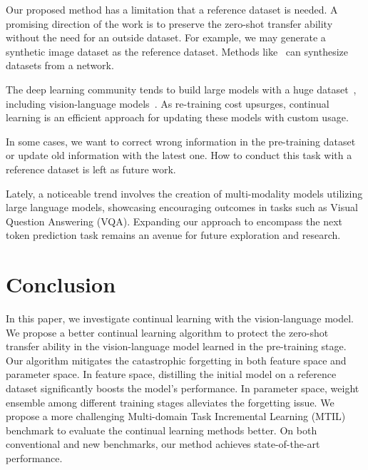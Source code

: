 Our proposed method has a limitation that a reference dataset is needed. A promising direction of the work is to preserve the zero-shot transfer ability without the need for an outside dataset. For example, we may generate a synthetic image dataset as the reference dataset. Methods like~\cite{smith2021always} can synthesize datasets from a network.

The deep learning community tends to build large models with a huge dataset~\cite{brown2020language,dehghani2023scaling}, including vision-language models~\cite{radford2021learning,huang2023language}. 
As re-training cost upsurges, continual learning is an efficient approach for updating these models with custom usage.

In some cases, we want to correct wrong information in the pre-training dataset or update old information with the latest one. How to conduct this task with a reference dataset is left as future work.

Lately, a noticeable trend involves the creation of multi-modality models utilizing large language models, showcasing encouraging outcomes in tasks such as Visual Question Answering (VQA). Expanding our approach to encompass the next token prediction task remains an avenue for future exploration and research.

\section{Conclusion}
\label{sec:conclusion}

In this paper, we investigate continual learning with the vision-language model. We propose a better continual learning algorithm to protect the zero-shot transfer ability in the vision-language model learned in the pre-training stage. Our algorithm mitigates the catastrophic forgetting in both feature space and parameter space. In feature space, distilling the initial model on a reference dataset significantly boosts the model's performance. In parameter space, weight ensemble among different training stages alleviates the forgetting issue. We propose a more challenging Multi-domain Task Incremental Learning (MTIL) benchmark to evaluate the continual learning methods better. On both conventional and new benchmarks, our method achieves state-of-the-art performance.
